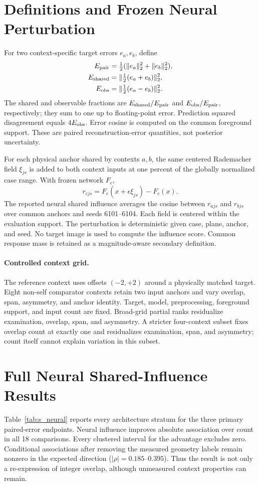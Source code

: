 \documentclass[10pt,twocolumn,letterpaper]{article}
\begin{document}
\section{Definitions and Frozen Neural Perturbation}
For two context-specific target errors $e_a,e_b$, define
\begin{align}
E_{\rm pair}&=\tfrac12(\|e_a\|_2^2+\|e_b\|_2^2),\\
E_{\rm shared}&=\|\tfrac12(e_a+e_b)\|_2^2,\\
E_{\rm obs}&=\|\tfrac12(e_a-e_b)\|_2^2.
\end{align}
The shared and observable fractions are $E_{\rm shared}/E_{\rm pair}$ and $E_{\rm obs}/E_{\rm pair}$, respectively; they sum to one up to floating-point error. Prediction squared disagreement equals $4E_{\rm obs}$. Error cosine is computed on the common foreground support. These are paired reconstruction-error quantities, not posterior uncertainty.

For each physical anchor shared by contexts $a,b$, the same centered Rademacher field $\xi_{js}$ is added to both context inputs at one percent of the globally normalized case range. With frozen network $F_c$,
\begin{equation}
r_{cjs}=F_c(x+\epsilon\xi_{js})-F_c(x).
\end{equation}
The reported neural shared influence averages the cosine between $r_{ajs}$ and $r_{bjs}$ over common anchors and seeds 6101--6104. Each field is centered within the evaluation support. The perturbation is deterministic given case, plane, anchor, and seed. No target image is used to compute the influence score. Common response mass is retained as a magnitude-aware secondary definition.

\paragraph{Controlled context grid.}
The reference context uses offsets $(-2,+2)$ around a physically matched target. Eight non-self comparator contexts retain two input anchors and vary overlap, span, asymmetry, and anchor identity. Target, model, preprocessing, foreground support, and input count are fixed. Broad-grid partial ranks residualize examination, overlap, span, and asymmetry. A stricter four-context subset fixes overlap count at exactly one and residualizes examination, span, and asymmetry; count itself cannot explain variation in this subset.

\section{Full Neural Shared-Influence Results}
Table~\ref{tab:s_neural} reports every architecture stratum for the three primary paired-error endpoints. Neural influence improves absolute association over count in all 18 comparisons. Every clustered interval for the advantage excludes zero. Conditional associations after removing the measured geometry labels remain nonzero in the expected direction ($|\rho|=0.185$--$0.395$). Thus the result is not only a re-expression of integer overlap, although unmeasured context properties can remain.
\end{document}
